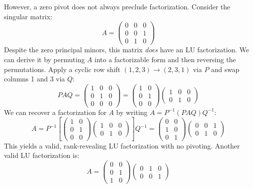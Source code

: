 \documentclass{article}
\begin{document}
However, a zero pivot does not always preclude factorization. Consider the singular matrix:
\[
    A = \begin{pmatrix} 0 & 0 & 0 \\ 0 & 0 & 1 \\ 0 & 1 & 0 \end{pmatrix}
\]
Despite the zero principal minors, this matrix \emph{does} have an LU factorization. We can derive it by permuting $A$ into a factorizable form and then reversing the permutations. Apply a cyclic row shift $(1,2,3) \to (2,3,1)$ via $P$ and swap columns 1 and 3 via $Q$:
\[
    PAQ = \begin{pmatrix} 1 & 0 & 0 \\ 0 & 1 & 0 \\ 0 & 0 & 0 \end{pmatrix}
    = \begin{pmatrix} 1 & 0 \\ 0 & 1 \\ 0 & 0 \end{pmatrix}
    \begin{pmatrix} 1 & 0 & 0 \\ 0 & 1 & 0 \end{pmatrix}
\]
We can recover a factorization for $A$ by writing $A = P^{-1} (PAQ) Q^{-1}$:
\[
    A = P^{-1} \left[ \begin{pmatrix} 1 & 0 \\ 0 & 1 \\ 0 & 0 \end{pmatrix}
        \begin{pmatrix} 1 & 0 & 0 \\ 0 & 1 & 0 \end{pmatrix} \right] Q^{-1} =
    \begin{pmatrix} 0 & 0 \\ 1 & 0 \\ 0 & 1 \end{pmatrix}
    \begin{pmatrix} 0 & 0 & 1 \\ 0 & 1 & 0 \end{pmatrix}
\]
This yields a valid, rank-revealing LU factorization with no pivoting. Another valid LU factorization is:
\[
    A = \begin{pmatrix} 0 & 0 \\ 0 & 1 \\ 1 & 0 \end{pmatrix}
    \begin{pmatrix} 0 & 1 & 0 \\ 0 & 0 & 1 \end{pmatrix}
\]
\end{document}
